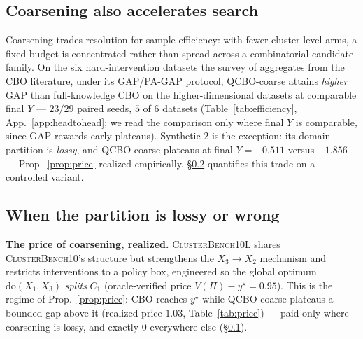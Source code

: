 \documentclass[twoside]{article}
\newcommand{\QCBO}{\textsc{QCBO}}
\newcommand{\CBO}{\textsc{CBO}}
\newcommand{\BO}{\textsc{BO}}
\newcommand{\CEO}{\textsc{CEO}}
\begin{document}
\begin{table}[t]\centering
  \caption{Scope of the guarantee: paired $\Delta$GAP and $\Delta$PA-GAP@100 (misspecified $-$ correct; mean$\pm$s.e., $10$ seeds). \QCBO{}-coarse is exactly $\mathbf{0}$ (byte-identical, bold) on every quotient-invisible perturbation, as Prop.~\ref{prop:invariance} guarantees, and moves only under the inter bow. $0^{\dagger}$: \CEO{} coincides with its correct-graph run on $P_7$ only because its DAG pool cannot represent a confounder omission --- representational blindness, not a guarantee. \BO{} is $\equiv\!0$ by construction; full rows in App.~\ref{app:fulltables}.}
  \label{tab:taxonomy}
\end{table}

\subsection{Coarsening also accelerates search}
\label{sec:exp-eff}
Coarsening trades resolution for sample efficiency: with fewer cluster-level arms, a fixed budget is concentrated rather than spread across a combinatorial candidate family. On the six hard-intervention datasets the survey of \citet{anonymous2026cbobench} aggregates from the CBO literature, under its GAP/PA-GAP protocol, \QCBO{}-coarse attains \emph{higher} GAP than full-knowledge \CBO{} on the higher-dimensional datasets at comparable final $Y$ --- $23/29$ paired seeds, $5$ of $6$ datasets (Table~\ref{tab:efficiency}, App.~\ref{app:headtohead}; we read the comparison only where final $Y$ is comparable, since GAP rewards early plateaus). Synthetic-2 is the exception: its domain partition is \emph{lossy}, and \QCBO{}-coarse plateaus at final $Y=-0.511$ versus $-1.856$ --- Prop.~\ref{prop:price} realized empirically. \S\ref{sec:exp-partition} quantifies this trade on a controlled variant.

\subsection{When the partition is lossy or wrong}
\label{sec:exp-partition}
\textbf{The price of coarsening, realized.}
\textsc{ClusterBench10L} shares \textsc{ClusterBench10}'s structure but strengthens the $X_3\!\to\!X_2$ mechanism and restricts interventions to a policy box, engineered so the global optimum $\mathrm{do}(X_1,X_3)$ \emph{splits} $C_1$ (oracle-verified price $V(\Pi)-y^\star=0.95$). This is the regime of Prop.~\ref{prop:price}: \CBO{} reaches $y^\star$ while \QCBO{}-coarse plateaus a bounded gap above it (realized price $1.03$, Table~\ref{tab:price}) --- paid only where coarsening is lossy, and exactly $0$ everywhere else (\S\ref{sec:exp-eff}).
\end{document}
